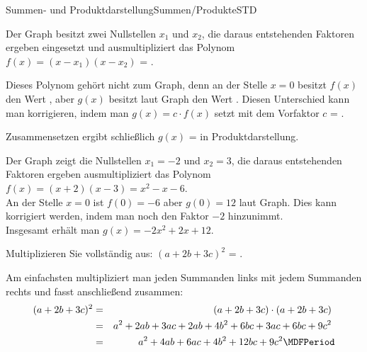 \begin{MXContent}{Summen- und Produktdarstellung}{Summen/Produkte}{STD}
\begin{MExercise}
\begin{MExerciseItems}
\item{Der Graph besitzt zwei Nullstellen $x_1$ und $x_2$, die daraus entstehenden Faktoren ergeben eingesetzt und ausmultipliziert das Polynom $f(x)=(x-x_1)(x-x_2)$ = .} %
\item{Dieses Polynom gehört nicht zum Graph, denn an der Stelle $x=0$ besitzt $f(x)$ den Wert , aber $g(x)$ besitzt
laut Graph den Wert .
Diesen Unterschied kann man korrigieren, indem man $g(x)=c\cdot f(x)$ setzt mit dem Vorfaktor $c$ = .}
\item{Zusammensetzen ergibt schließlich $g(x)$ =  in Produktdarstellung.}
\end{MExerciseItems}
\begin{MHint}{\iSolution}
Der Graph zeigt die Nullstellen $x_1=-2$ und $x_2=3$, die daraus entstehenden Faktoren ergeben ausmultipliziert
das Polynom $f(x)=(x+2)(x-3)=x^2-x-6$. \\
An der Stelle $x=0$ ist $f(0)=-6$ aber $g(0)=12$ laut Graph. Dies kann korrigiert werden, indem man noch den Faktor $-2$ hinzunimmt. \\
Insgesamt erhält man $g(x)=-2x^2+2x+12$.
\end{MHint}
\end{MExercise}


\begin{MExercise}
Multiplizieren Sie vollständig aus: $(a+2b+3c)^2$ = .

\begin{MHint}{\iSolution}
Am einfachsten multipliziert man jeden Summanden links mit jedem Summanden rechts und fasst anschließend zusammen:
\begin{eqnarray*}
(a+2b+3c)^2 & = & (a+2b+3c)\cdot(a+2b+3c)  \ \\
&=& a^2+2a b+3a c+2a b+4b^2+6b c+3a c+6b c+9c^2 \ \\
&=& a^2 +4a b+6a c+4b^2+12b c+9c^2 \MDFPeriod 
\end{eqnarray*}
\end{MHint}
\end{MExercise}

\end{MXContent}


